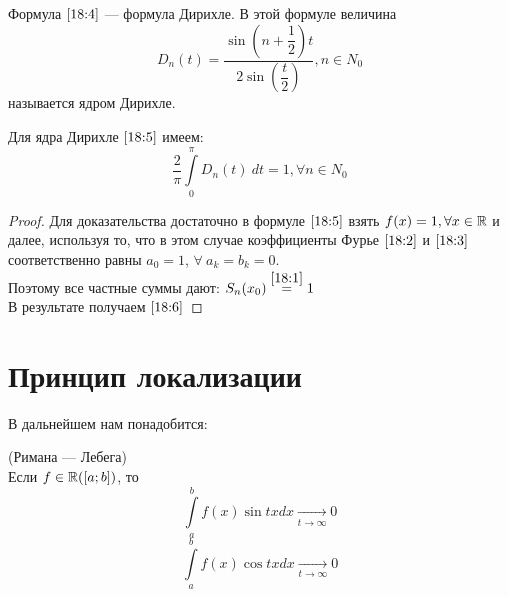 \documentclass[../../main.tex]{subfiles}
\begin{document}
\begin{rem}
	Формула $\eqref{18:4}$ --- формула Дирихле. В этой формуле величина
	\begin{equation}
		\label{18:5}
		D_n(t) = \dfrac{\sin(n+\dfrac{1}{2})t}{2\sin(\dfrac{t}{2})},
		n \in N_0 
	\end{equation}
	называется ядром Дирихле.
\end{rem}

\begin{crl*}
	Для ядра Дирихле $\eqref{18:5}$ имеем:
	\begin{equation}
		\label{18:6}
		\dfrac{2}{\pi}\int\limits_{0}^{\pi}{D_n(t)\ dt} = 1, \forall
		n \in N_0
	\end{equation}
\end{crl*}
\begin{proof}
	Для доказательства достаточно в формуле $\eqref{18:5}$ взять
	$f(x) = 1, \forall x \in \mathbb{R}$ и далее, используя то, что в этом
	случае коэффициенты Фурье $\eqref{18:2}$ и $\eqref{18:3}$
	соответственно равны $a_0 = 1$, $\forall\ a_k = b_k = 0$.\\
	Поэтому все частные суммы дают:
	$S_n(x_0) \stackrel{\eqref{18:1}}= 1$
	\\В результате получаем $\eqref{18:6}$
\end{proof}


\section{Принцип локализации}
В дальнейшем нам понадобится:
\begin{lemma}(Римана --- Лебега)\\
	Если $f \in \mathbb{R}([a; b])$, то \\
	\begin{equation}
		\label{18:7}
		\int\limits_{a}^{b}{f(x)\sin{tx}dx} \underset
		{t \rightarrow \infty}{\rightarrow} 0 
	\end{equation}
	\begin{equation}
	\label{18:8}
	\int\limits_{a}^{b}{f(x)\cos{tx}dx} \underset
	{t \rightarrow \infty}{\rightarrow} 0
	\end{equation}
\end{lemma}
\end{document}
